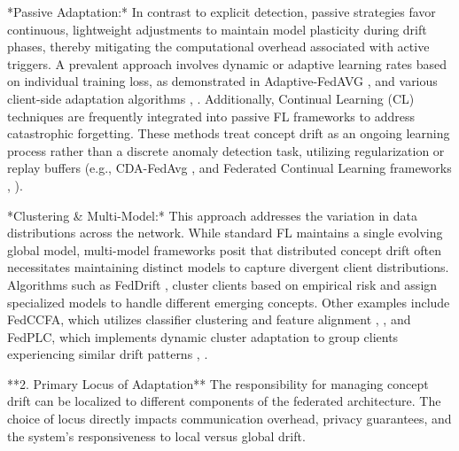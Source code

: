 \documentclass[journal]{IEEEtran}
\begin{document}
*Passive Adaptation:* In contrast to explicit detection, passive strategies favor continuous, lightweight adjustments to maintain model plasticity during drift phases, thereby mitigating the computational overhead associated with active triggers. A prevalent approach involves dynamic or adaptive learning rates based on individual training loss, as demonstrated in Adaptive-FedAVG \cite{Canonaco2021a}, \cite{Canonaco2021} and various client-side adaptation algorithms \cite{Saile2024a}, \cite{Saile2024}. Additionally, Continual Learning (CL) techniques are frequently integrated into passive FL frameworks to address catastrophic forgetting. These methods treat concept drift as an ongoing learning process rather than a discrete anomaly detection task, utilizing regularization or replay buffers (e.g., CDA-FedAvg \cite{Casado2021a}, \cite{Casado2021} and Federated Continual Learning frameworks \cite{Hamedi2025}, \cite{Benameur2025}).

*Clustering & Multi-Model:* This approach addresses the variation in data distributions across the network. While standard FL maintains a single evolving global model, multi-model frameworks posit that distributed concept drift often necessitates maintaining distinct models to capture divergent client distributions. Algorithms such as FedDrift \cite{Jothimurugesan2022}, \cite{Jothimurugesan2022a} cluster clients based on empirical risk and assign specialized models to handle different emerging concepts. Other examples include FedCCFA, which utilizes classifier clustering and feature alignment \cite{Chen2024}, \cite{Chen2024a}, and FedPLC, which implements dynamic cluster adaptation to group clients experiencing similar drift patterns \cite{Zhou2026}, \cite{Zhou2026a}.

**2. Primary Locus of Adaptation**
The responsibility for managing concept drift can be localized to different components of the federated architecture. The choice of locus directly impacts communication overhead, privacy guarantees, and the system's responsiveness to local versus global drift.
\end{document}
